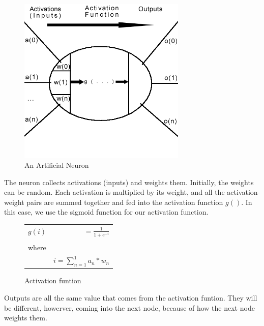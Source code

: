 \documentclass[12pt]{article}
\begin{document}
\begin{figure}[h]
        \begin{center}
		\includegraphics[width=80mm]{report_images/neuron01.png}
                	\caption{An Artificial Neuron}
                	\label{neuron01}
        \end{center}
\end{figure}

\pagebreak

The neuron collects activations (inputs) and weights them. Initially, the weights can be random. Each activation is multiplied by its weight, and all the activation-weight pairs are summed together and fed into 
the activation function $ g() $. In this case, we use the sigmoid function for our activation function.

\begin{figure}[h]
        \begin{center}
		\begin{tabular}{l r}
			$g ( i )$		&	$ = \frac{1}{1 + e^{-i}} $		\\
						&							\\
			where			&						\\
						&	$i  = \sum_{n=1}^1 a_n * w_n$ 	\\

		\end{tabular}
                	\caption{Activation funtion}
                	\label{act_func01}
        \end{center}
\end{figure}

Outputs are all the same value that comes from the activation funtion. They will be different, howerver, coming into the next node, because of how the next node weights them.
\end{document}
